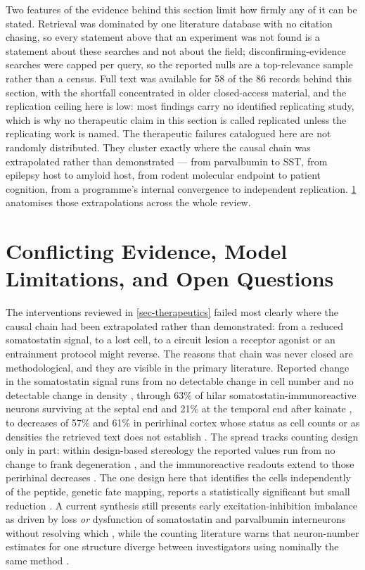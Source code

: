 \documentclass[11pt]{article}
\begin{document}
Two features of the evidence behind this section limit how firmly any of it can be stated. Retrieval was dominated by one literature database with no citation chasing, so every statement above that an experiment was not found is a statement about these searches and not about the field; disconfirming-evidence searches were capped per query, so the reported nulls are a top-relevance sample rather than a census. Full text was available for 58 of the 86 records behind this section, with the shortfall concentrated in older closed-access material, and the replication ceiling here is low: most findings carry no identified replicating study, which is why no therapeutic claim in this section is called replicated unless the replicating work is named. The therapeutic failures catalogued here are not randomly distributed. They cluster exactly where the causal chain was extrapolated rather than demonstrated --- from parvalbumin to SST, from epilepsy host to amyloid host, from rodent molecular endpoint to patient cognition, from a programme's internal convergence to independent replication. \ref{sec-conflicts-limitations} anatomises those extrapolations across the whole review.

\section{Conflicting Evidence, Model Limitations, and Open Questions}
\label{sec-conflicts-limitations}

The interventions reviewed in \ref{sec-therapeutics} failed most clearly where the causal chain had been extrapolated rather than demonstrated: from a reduced somatostatin signal, to a lost cell, to a circuit lesion a receptor agonist or an entrainment protocol might reverse. The reasons that chain was never closed are methodological, and they are visible in the primary literature. Reported change in the somatostatin signal runs from no detectable change in cell number \citep{Futacsi2025} and no detectable change in density \citep{Sos2020}, through 63\% of hilar somatostatin-immunoreactive neurons surviving at the septal end and 21\% at the temporal end after kainate \citep{Jolkkonen1997}, to decreases of 57\% and 61\% in perirhinal cortex whose status as cell counts or as densities the retrieved text does not establish \citep{SanchezMejias2019}. The spread tracks counting design only in part: within design-based stereology the reported values run from no change \citep{Futacsi2025,Sos2020} to frank degeneration \citep{Loreth2012}, and the immunoreactive readouts extend to those perirhinal decreases \citep{SanchezMejias2019}. The one design here that identifies the cells independently of the peptide, genetic fate mapping, reports a statistically significant but small reduction \citep{Drake2024}. A current synthesis still presents early excitation-inhibition imbalance as driven by loss \emph{or} dysfunction of somatostatin and parvalbumin interneurons without resolving which \citep{Okechukwu2026}, while the counting literature warns that neuron-number estimates for one structure diverge between investigators using nominally the same method \citep{HerculanoHouzel2015}.
\end{document}
